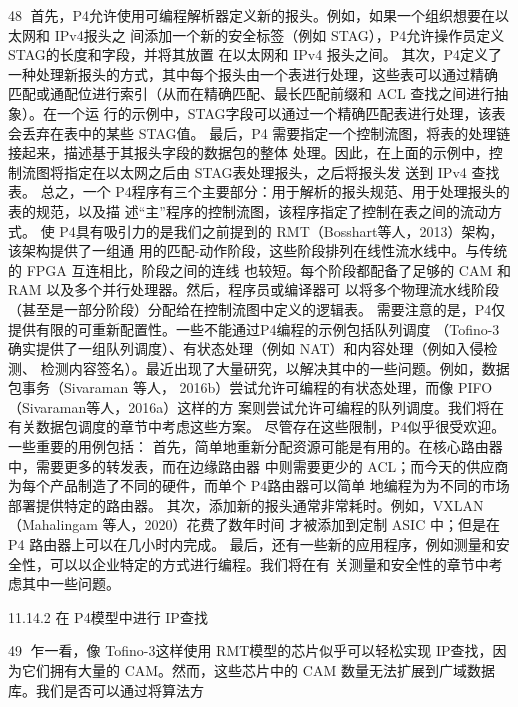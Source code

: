                                                          48
首先，P4允许使用可编程解析器定义新的报头。例如，如果一个组织想要在以太网和 IPv4报头之
间添加一个新的安全标签（例如 STAG），P4允许操作员定义 STAG的长度和字段，并将其放置
在以太网和 IPv4 报头之间。
 其次，P4定义了一种处理新报头的方式，其中每个报头由一个表进行处理，这些表可以通过精确
匹配或通配位进行索引（从而在精确匹配、最长匹配前缀和 ACL 查找之间进行抽象）。在一个运
行的示例中，STAG字段可以通过一个精确匹配表进行处理，该表会丢弃在表中的某些 STAG值。
  最后，P4 需要指定一个控制流图，将表的处理链接起来，描述基于其报头字段的数据包的整体
处理。因此，在上面的示例中，控制流图将指定在以太网之后由 STAG表处理报头，之后将报头发
送到 IPv4 查找表。
总之，一个 P4程序有三个主要部分：用于解析的报头规范、用于处理报头的表的规范，以及描
述“主”程序的控制流图，该程序指定了控制在表之间的流动方式。
使 P4具有吸引力的是我们之前提到的 RMT（Bosshart等人，2013）架构，该架构提供了一组通
用的匹配-动作阶段，这些阶段排列在线性流水线中。与传统的 FPGA 互连相比，阶段之间的连线
也较短。每个阶段都配备了足够的 CAM 和 RAM 以及多个并行处理器。然后，程序员或编译器可
以将多个物理流水线阶段（甚至是一部分阶段）分配给在控制流图中定义的逻辑表。
需要注意的是，P4仅提供有限的可重新配置性。一些不能通过P4编程的示例包括队列调度
（Tofino-3确实提供了一组队列调度）、有状态处理（例如 NAT）和内容处理（例如入侵检测、
检测内容签名）。最近出现了大量研究，以解决其中的一些问题。例如，数据包事务（Sivaraman
等人， 2016b）尝试允许可编程的有状态处理，而像 PIFO（Sivaraman等人，2016a）这样的方
案则尝试允许可编程的队列调度。我们将在有关数据包调度的章节中考虑这些方案。
尽管存在这些限制，P4似乎很受欢迎。一些重要的用例包括：
首先，简单地重新分配资源可能是有用的。在核心路由器中，需要更多的转发表，而在边缘路由器
中则需要更少的 ACL；而今天的供应商为每个产品制造了不同的硬件，而单个 P4路由器可以简单
地编程为为不同的市场部署提供特定的路由器。
其次，添加新的报头通常非常耗时。例如，VXLAN（Mahalingam 等人，2020）花费了数年时间
才被添加到定制 ASIC 中；但是在 P4 路由器上可以在几小时内完成。
最后，还有一些新的应用程序，例如测量和安全性，可以以企业特定的方式进行编程。我们将在有
关测量和安全性的章节中考虑其中一些问题。

11.14.2 在 P4模型中进行 IP查找

                                                    49
乍一看，像 Tofino-3这样使用 RMT模型的芯片似乎可以轻松实现 IP查找，因为它们拥有大量的
CAM。然而，这些芯片中的 CAM 数量无法扩展到广域数据库。我们是否可以通过将算法方



